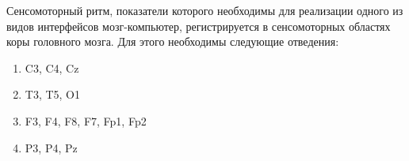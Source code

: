 
Сенсомоторный ритм, показатели которого необходимы для реализации одного из видов интерфейсов мозг-компьютер, регистрируется в сенсомоторных областях коры головного мозга. Для этого необходимы следующие отведения:

\begin{enumerate}
    \item C3, C4, Cz
    \item T3, T5, O1
    \item F3, F4, F8, F7, Fp1, Fp2
    \item P3, P4, Pz
\end{enumerate}